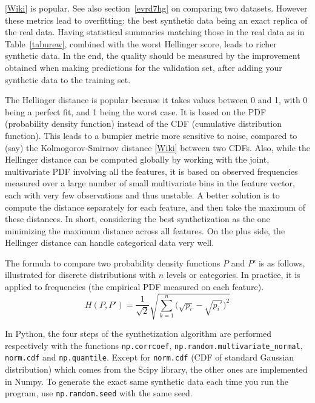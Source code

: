 \documentclass[oneside,10pt]{book}
\begin{document}
[\href{https://en.wikipedia.org/wiki/Hellinger_distance}{Wiki}] is popular.  See also section~\ref{evrd7hg}
 on comparing two datasets. However these metrics lead to \textcolor{index}{overfitting}: the best synthetic data being an exact replica of the real data. Having statistical summaries matching those in the real data as in Table~\ref{taburew}, combined with the worst Hellinger score, leads to richer synthetic data. In the end, the quality should be measured by the improvement obtained when making predictions for the \textcolor{index}{validation set}, after adding your synthetic data to the training set.

The Hellinger distance is popular because it takes values between 0 and 1, with 0 being a perfect fit, and 1 being the worst case. It is based on the PDF (probability density function) instead of the CDF (cumulative distribution function). This leads to a bumpier metric more sensitive to noise, compared to (say) the
\textcolor{index}{Kolmogorov-Smirnov distance}  [\href{https://en.wikipedia.org/wiki/Kolmogorov\%E2\%80\%93Smirnov_test}{Wiki}] between two CDFs.
Also, while the Hellinger distance can be computed globally by working with the joint, multivariate PDF involving all the features, it is based on  observed frequencies measured over a large number of small multivariate bins in the feature vector, each with very few observations and thus unstable.  A better solution is to compute the distance separately for each feature, and then take the maximum of these distances. In short, considering the best synthetization as the one minimizing the maximum distance across all features. On the plus side, the Hellinger distance can handle categorical data very well.

The formula to compare two probability density functions $P$ and $P'$ is as follows, illustrated for discrete distributions with $n$ levels or categories. In practice, it is applied to frequencies (the empirical PDF measured on each feature).
$$
H(P,P') = \frac{1}{\sqrt{2}} \sqrt{\sum_{k=1}^n \Big(\sqrt{p_i}-\sqrt{p_i'}\Big)^2}
$$

In Python, the four steps of the synthetization algorithm are performed respectively with the functions \texttt{np.corrcoef},
 \texttt{np.random.multivariate\_normal}, \texttt{norm.cdf}
 and \texttt{np.quantile}. Except for \texttt{norm.cdf} (CDF of standard Gaussian distribution) which comes from the Scipy library, the other ones are implemented in Numpy. To generate the exact same synthetic data each time you run the program,
 use \texttt{np.random.seed} with the same \textcolor{index}{seed}.
\end{document}
